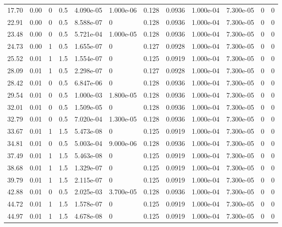 \documentclass[preview]{standalone}
\begin{document}
{{\begin{tabular}{L{1.2cm}C{1.2cm} C{0.3cm}C{0.5cm} C{1.4cm}C{1.4cm} C{1.4cm}C{1.4cm} C{1.6cm}C{1.6cm} C{1.6cm}C{1.6cm}}
  17.70  &  0.00  & 0     & 0.5 &  4.090e-05  & 1.000e-06  &  0.128&   0.0936& 1.000e-04 & 7.300e-05   &  0 & 0  \\ 
  22.91  &  0.00  & 0     & 0.5 &  8.588e-07  & 0  &  0.128&   0.0936& 1.000e-04 & 7.300e-05   &  0 & 0  \\ 
  23.48  &  0.00  & 0     & 0.5 &  5.721e-04  & 1.000e-05  &  0.128&   0.0936& 1.000e-04 & 7.300e-05   &  0 & 0  \\ 
  24.73  &  0.00  & 1     & 0.5 &  1.655e-07  & 0  &  0.127&   0.0928& 1.000e-04 & 7.300e-05   &  0 & 0  \\ 
  25.52  &  0.01  & 1     & 1.5 &  1.554e-07  & 0  &  0.125&   0.0919& 1.000e-04 & 7.300e-05   &  0 & 0  \\ 
  28.09  &  0.01  & 1     & 0.5 &  2.298e-07  & 0  &  0.127&   0.0928& 1.000e-04 & 7.300e-05   &  0 & 0  \\ 
  28.42  &  0.01  & 0     & 0.5 &  6.847e-06  & 0  &  0.128&   0.0936& 1.000e-04 & 7.300e-05   &  0 & 0  \\ 
  29.54  &  0.01  & 0     & 0.5 &  1.000e-03  & 1.800e-05  &  0.128&   0.0936& 1.000e-04 & 7.300e-05   &  0 & 0  \\ 
  32.01  &  0.01  & 0     & 0.5 &  1.509e-05  & 0  &  0.128&   0.0936& 1.000e-04 & 7.300e-05   &  0 & 0  \\ 
  32.79  &  0.01  & 0     & 0.5 &  7.020e-04  & 1.300e-05  &  0.128&   0.0936& 1.000e-04 & 7.300e-05   &  0 & 0  \\ 
  33.67  &  0.01  & 1     & 1.5 &  5.473e-08  & 0  &  0.125&   0.0919& 1.000e-04 & 7.300e-05   &  0 & 0  \\ 
  34.81  &  0.01  & 0     & 0.5 &  5.003e-04  & 9.000e-06  &  0.128&   0.0936& 1.000e-04 & 7.300e-05   &  0 & 0  \\ 
  37.49  &  0.01  & 1     & 1.5 &  5.463e-08  & 0  &  0.125&   0.0919& 1.000e-04 & 7.300e-05   &  0 & 0  \\ 
  38.68  &  0.01  & 1     & 1.5 &  1.329e-07  & 0  &  0.125&   0.0919& 1.000e-04 & 7.300e-05   &  0 & 0  \\ 
  39.79  &  0.01  & 1     & 1.5 &  2.115e-07  & 0  &  0.125&   0.0919& 1.000e-04 & 7.300e-05   &  0 & 0  \\ 
  42.88  &  0.01  & 0     & 0.5 &  2.025e-03  & 3.700e-05  &  0.128&   0.0936& 1.000e-04 & 7.300e-05   &  0 & 0  \\ 
  44.72  &  0.01  & 1     & 1.5 &  1.578e-07  & 0  &  0.125&   0.0919& 1.000e-04 & 7.300e-05   &  0 & 0  \\ 
  44.97  &  0.01  & 1     & 1.5 &  4.678e-08  & 0  &  0.125&   0.0919& 1.000e-04 & 7.300e-05   &  0 & 0  \\ 

\end{tabular}}}
\end{document}
